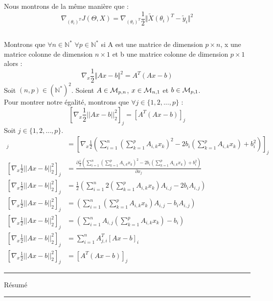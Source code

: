 \documentclass[a4paper,10pt]{article}
\begin{document}
Nous montrons de la même manière que : \[\nabla_{(\theta_{i})^T} J(\Theta, X) = \nabla_{(\theta_{i})^T}\frac{1}{2}\Vert\tilde{X}(\theta_{i})^{T}-\tilde{y}_{i}\Vert^{2}\]
\subsection{}  
\label{P2}
Montrons que $\forall n \in \mathbb{N}^{*}$ $\forall p \in \mathbb{N}^{*}$ si A est une matrice de dimension $p \times n$, x une matrice colonne de dimension $n \times 1$ et b une matrice colonne de dimension $p \times 1$ alors : \[\nabla_{x}\frac{1}{2}\Vert Ax-b \Vert^2 = A^{T}(Ax-b)\]
Soit $(n,p) \in (\mathbb{N}^*)^2$. Soient $A \in {\cal M}_{p, n}$, $x \in {\cal M}_{n, 1}$ et $b \in {\cal M}_{p, 1}$.\\
Pour montrer notre égalité, montrons que $\forall j \in \{1, 2, ..., p\}$ : \[[\nabla_{x} \frac{1}{2}||Ax - b||^{2}_{2}]_{j} = [A^{T}(Ax - b)]_{j}\]
Soit $j \in \{1, 2, ..., p\}$.
\begin{align*}  
[\nabla_{x} \frac{1}{2}||Ax - b||^{2}_{2}]_{j} &= [\nabla_{x} \frac{1}{2}(\sum^{n}_{i = 1} (\sum^{p}_{k = 1} A_{i, k}x_{k})^{2} - 2b_{i}(\sum^{p}_{k = 1} A_{i, k}x_{k}) + b_{i}^{2})]_{j}\\  
[\nabla_{x} \frac{1}{2}||Ax - b||^{2}_{2}]_{j} &= \frac{\partial\frac{1}{2}(\sum^{n}_{i = 1} (\sum^{p}_{k = 1} A_{i, k}x_{k})^{2} - 2b_{i}(\sum^{p}_{k = 1} A_{i, k}x_{k}) + b_{i}^{2})}{\partial x_{j}}\\  
[\nabla_{x} \frac{1}{2}||Ax - b||^{2}_{2}]_{j} &= \frac{1}{2}(\sum^{n}_{i = 1} 2(\sum^{p}_{k = 1} A_{i, k}x_{k})A_{i, j} - 2b_{i} A_{i, j})\\  
[\nabla_{x} \frac{1}{2}||Ax - b||^{2}_{2}]_{j} &= (\sum^{n}_{i = 1} (\sum^{p}_{k = 1} A_{i, k}x_{k})A_{i, j} - b_{i} A_{i, j})\\  
[\nabla_{x} \frac{1}{2}||Ax - b||^{2}_{2}]_{j} &= (\sum^{n}_{i = 1} A_{i, j}(\sum^{p}_{k = 1} A_{i, k}x_{k}) - b_{i} )\\  
[\nabla_{x} \frac{1}{2}||Ax - b||^{2}_{2}]_{j} &= \sum^{n}_{i = 1} A^{T}_{j, i}[Ax - b]_{i}\\  
[\nabla_{x} \frac{1}{2}||Ax - b||^{2}_{2}]_{j} &= [A^{T}(Ax - b)]_{j}  
\end{align*}


\newpage

\hrule height 1pt
\begin{center}
\begin{Large}Résumé\end{Large}
\end{center}
\hrule height 1pt
\vskip 1cm
\end{document}
